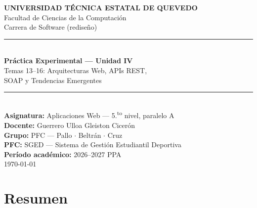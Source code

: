 \documentclass[12pt,a4paper]{article}
\begin{document}

\begin{titlepage}
  \begin{center}
    \vspace*{1cm}
    {\LARGE \textbf{UNIVERSIDAD TÉCNICA ESTATAL DE QUEVEDO}}\\[0.3cm]
    {\large Facultad de Ciencias de la Computación}\\[0.2cm]
    {\large Carrera de Software (rediseño)}\\[2cm]

    \rule{\linewidth}{0.5mm}\\[0.4cm]
    {\huge \textbf{Práctica Experimental --- Unidad IV}}\\[0.3cm]
    {\Large Temas 13--16: Arquitecturas Web, APIs REST,\\[0.1cm]
     SOAP y Tendencias Emergentes}\\[0.3cm]
    \rule{\linewidth}{0.5mm}\\[1.5cm]

    {\large \textbf{Asignatura:} Aplicaciones Web --- 5.\textsuperscript{to} nivel, paralelo A}\\[0.3cm]
    {\large \textbf{Docente:} Guerrero Ulloa Gleiston Cicerón}\\[0.3cm]
    {\large \textbf{Grupo:} PFC --- Pallo $\cdot$ Beltrán $\cdot$ Cruz}\\[0.3cm]
    {\large \textbf{PFC:} SGED --- Sistema de Gestión Estudiantil Deportiva}\\[0.3cm]
    {\large \textbf{Período académico:} 2026--2027 PPA}\\[2cm]

    \vfill
    {\large \today}
  \end{center}
\end{titlepage}

\newpage

\section*{Resumen}
\end{document}
